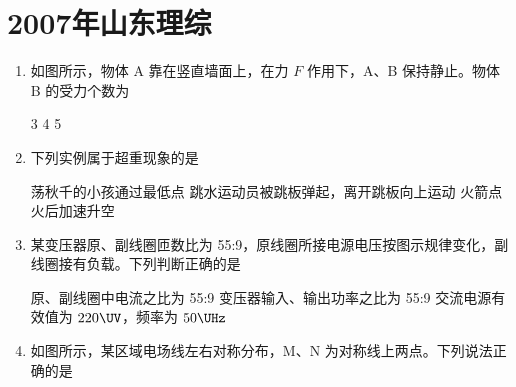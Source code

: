 \documentclass[\gkver]{gaokaozhenti}
\begin{document}
\chapter{2007年山东理综}

\begin{enumerate}
\item
如图所示，物体 A 靠在竖直墙面上，在力 $F$ 作用下，A、B 保持静止。物体 B 的受力个数为


{3}
{4}
{5}


\item
下列实例属于超重现象的是

{荡秋千的小孩通过最低点}
{跳水运动员被跳板弹起，离开跳板向上运动}
{火箭点火后加速升空}


\item
某变压器原、副线圈匝数比为 55:9，原线圈所接电源电压按图示规律变化，副线圈接有负载。下列判断正确的是


{原、副线圈中电流之比为 55:9}
{变压器输入、输出功率之比为 55:9}
{交流电源有效值为 $220\UV$，频率为 $50\UHz$}


\item
如图所示，某区域电场线左右对称分布，M、N 为对称线上两点。下列说法正确的是


\end{enumerate}
\end{document}

